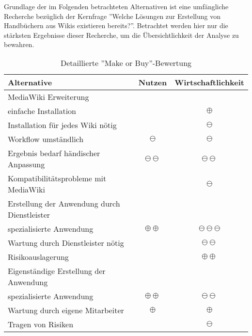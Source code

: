 \label{app:make_or_buy}

Grundlage der im Folgenden betrachteten Alternativen ist eine umfängliche Recherche bezüglich der Kernfrage
''Welche Lösungen zur Erstellung von Handbüchern aus Wikis existieren bereits?''.
Betrachtet werden hier nur die stärksten Ergebnisse dieser Recherche, um die Übersichtlichkeit der Analyse zu bewahren.

\begin{table}[H]
	\centering
	\begin{tabular}{lcc}

		\rowcolor{white!15}				
		\textbf{Alternative} & \textbf{Nutzen} & \textbf{Wirtschaftlichkeit} \\\hline		
		
		\rowcolor{MidnightBlue!15}
		MediaWiki Erweiterung 								& 					& 							\\\hline
		\hspace{1.5em} einfache Installation 				&					& $\oplus$  				\\
		\hspace{1.5em} Installation für jedes Wiki nötig 	&					& $\ominus$ 				\\
		\hspace{1.5em} Workflow umständlich 				& $\ominus$ 		& $\ominus$ 				\\
		\hspace{1.5em} Ergebnis bedarf händischer Anpassung	& $\ominus\ominus$	& $\ominus\ominus$ 			\\
		\hspace{1.5em} Kompatibilitätsprobleme mit MediaWiki	&  					& $\ominus$ 				\\
		
		\rowcolor{MidnightBlue!15}
		Erstellung der Anwendung durch Dienstleister 		& 					& 							\\\hline
		\hspace{1.5em} spezialisierte Anwendung 			& $\oplus\oplus$	& $\ominus\ominus\ominus$	\\
		\hspace{1.5em} Wartung durch Dienstleister nötig 	&					& $\ominus\ominus$ 			\\
		\hspace{1.5em} Risikoauslagerung 					&  					& $\oplus\oplus$ 			\\
		
		\rowcolor{MidnightBlue!15}
		Eigenständige Erstellung der Anwendung 				& 					& 							\\\hline
		\hspace{1.5em} spezialisierte Anwendung 			& $\oplus\oplus$	& $\ominus\ominus$ 			\\
		\hspace{1.5em} Wartung durch eigene Mitarbeiter  	& $\oplus$			& $\oplus$ 					\\
		\hspace{1.5em} Tragen von Risiken 					&  					& $\ominus$ 				\\									
			    
	\end{tabular}
	
	\caption{Detaillierte ''Make or Buy''-Bewertung}
	\label{tab:make_or_buy_detail}
\end{table}		